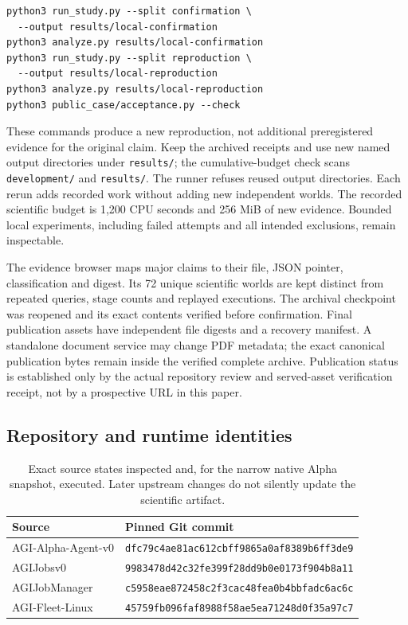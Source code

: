 \begin{verbatim}
python3 run_study.py --split confirmation \
  --output results/local-confirmation
python3 analyze.py results/local-confirmation
python3 run_study.py --split reproduction \
  --output results/local-reproduction
python3 analyze.py results/local-reproduction
python3 public_case/acceptance.py --check
\end{verbatim}
These commands produce a new reproduction, not additional preregistered evidence for the original claim. Keep the archived receipts and use new named output directories under \texttt{results/}; the cumulative-budget check scans \texttt{development/} and \texttt{results/}. The runner refuses reused output directories. Each rerun adds recorded work without adding new independent worlds. The recorded scientific budget is 1,200 CPU seconds and 256 MiB of new evidence. Bounded local experiments, including failed attempts and all intended exclusions, remain inspectable.

The evidence browser maps major claims to their file, JSON pointer, classification and digest. Its 72 unique scientific worlds are kept distinct from repeated queries, stage counts and replayed executions. The archival checkpoint was reopened and its exact contents verified before confirmation. Final publication assets have independent file digests and a recovery manifest. A standalone document service may change PDF metadata; the exact canonical publication bytes remain inside the verified complete archive. Publication status is established only by the actual repository review and served-asset verification receipt, not by a prospective URL in this paper.

\subsection{Repository and runtime identities}
\begin{table}[htbp]
\centering\small
\begin{tabularx}{\textwidth}{@{}p{1.4in}Y@{}}
\toprule
Source & Pinned Git commit \\
\midrule
AGI-Alpha-Agent-v0 & \texttt{dfc79c4ae81ac612cbff9865a0af8389b6ff3de9} \\
AGIJobsv0 & \texttt{9983478d42c32fe399f28dd9b0e0173f904b8a11} \\
AGIJobManager & \texttt{c5958eae872458c2f3cac48fea0b4bbfadc6ac6c} \\
AGI-Fleet-Linux & \texttt{45759fb096faf8988f58ae5ea71248d0f35a97c7} \\
\bottomrule
\end{tabularx}
\caption{Exact source states inspected and, for the narrow native Alpha snapshot, executed. Later upstream changes do not silently update the scientific artifact.}
\label{tab:identities}
\end{table}

